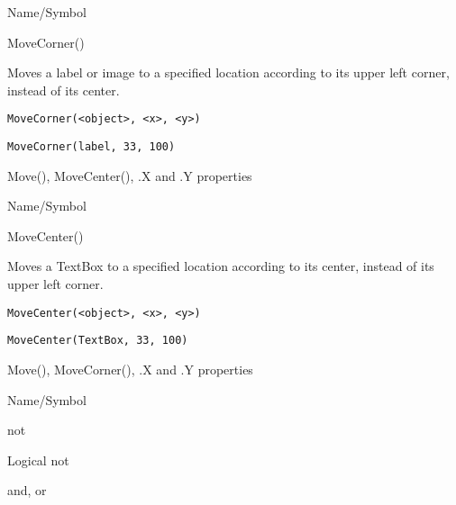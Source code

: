 \rl


\begin{desc}{Name/Symbol}
\item[Name/Symbol]	MoveCorner()

\item[Description]	Moves a label or image to a specified location
		according to its upper left corner, instead of its center. 

\item[Usage]
\begin{verbatim}
MoveCorner(<object>, <x>, <y>)
\end{verbatim}

\item[Example]	
\begin{verbatim}
MoveCorner(label, 33, 100)
\end{verbatim}

\item[See Also]	Move(), MoveCenter(), .X and .Y properties
\end{desc}

\rl




\begin{desc}{Name/Symbol}
\item[Name/Symbol]	MoveCenter()

\item[Description]	Moves a TextBox to a specified location
		according to its center, instead of its upper left corner.

\item[Usage]
\begin{verbatim}
MoveCenter(<object>, <x>, <y>)
\end{verbatim}

\item[Example]	
\begin{verbatim}
MoveCenter(TextBox, 33, 100)
\end{verbatim}

\item[See Also]	Move(), MoveCorner(), .X and .Y properties
\end{desc}

\rl


\begin{desc}{Name/Symbol}
\item[Name/Symbol]	not

\item[Description]	Logical not

\item[Usage]		

\item[Example]	

\item[See Also]	and, or
\end{desc}

